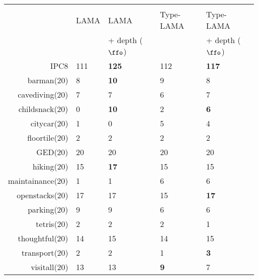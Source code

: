 \begin{center}
\begin{tabular}{|r|ll|ll|}
 &  &  &  & \\
 & LAMA & LAMA & Type-LAMA & Type-LAMA\\
 &  & + depth ($\ffo$) &  & + depth ($\ffo$)\\
\hline
IPC8 & 111 & \textbf{125} & 112 & \textbf{117}\\
\hline
barman(20) & 8 & \textbf{10} & 9 & 8\\
cavediving(20) & 7 & 7 & 6 & 7\\
childsnack(20) & 0 & \textbf{10} & 2 & \textbf{6}\\
citycar(20) & 1 & 0 & 5 & 4\\
floortile(20) & 2 & 2 & 2 & 2\\
GED(20) & 20 & 20 & 20 & 20\\
hiking(20) & 15 & \textbf{17} & 15 & 15\\
maintainance(20) & 1 & 1 & 6 & 6\\
openstacks(20) & 17 & 17 & 15 & \textbf{17}\\
parking(20) & 9 & 9 & 6 & 6\\
tetris(20) & 2 & 2 & 2 & 1\\
thoughtful(20) & 14 & 15 & 14 & 15\\
transport(20) & 2 & 2 & 1 & \textbf{3}\\
visitall(20) & 13 & 13 & \textbf{9} & 7\\
\hline
\end{tabular}
\end{center}
